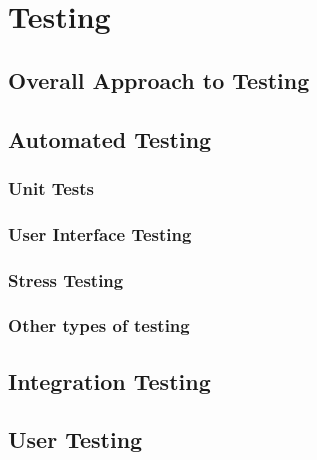 \section{Testing}





\subsection{Overall Approach to Testing}

\subsection{Automated Testing}

\subsubsection{Unit Tests}

\subsubsection{User Interface Testing}

\subsubsection{Stress Testing}

\subsubsection{Other types of testing}

\subsection{Integration Testing}

\subsection{User Testing}

